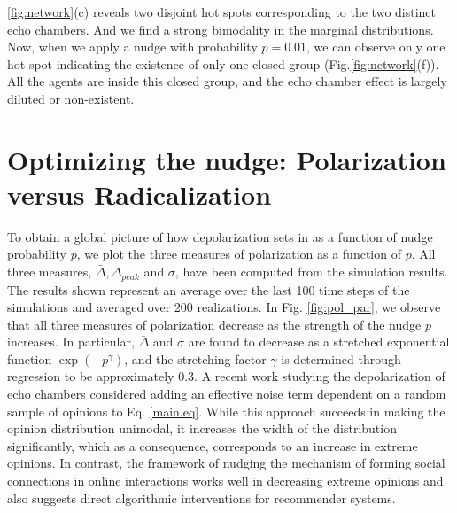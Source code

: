 \documentclass[%
 reprint,
superscriptaddress,
 amsmath,amssymb,
 aps,
 pre,
]{revtex4-1}
\begin{document}
\ref{fig:network}(c) reveals two disjoint hot spots corresponding to the two distinct echo chambers. And we find a strong bimodality in the marginal distributions.
Now, when we apply a nudge with probability $p=0.01$, we can observe only one hot spot indicating the existence of only one closed group (Fig.\ref{fig:network}(f)). All the agents are inside this closed group, and the echo chamber effect is largely diluted or non-existent. 

\section{Optimizing the nudge: Polarization versus Radicalization} 
To obtain a global picture of how depolarization sets in as a function of nudge probability $p$, we plot the three measures of polarization as a function of $p$. All three measures, $\bar\Delta, \Delta_{peak}$ and $\sigma$, have been computed from the simulation results. The results shown represent an average over the last 100 time steps of the simulations and averaged over 200 realizations. In Fig. \ref{fig:pol_par}, we observe that all three measures of polarization decrease as the strength of the nudge $p$ increases. In particular, $\bar \Delta$ and $\sigma$ are found to decrease as a stretched exponential function $\exp(-p^\gamma)$, and the stretching factor $\gamma$ is determined through regression to be approximately $0.3$. A recent work studying the depolarization of echo chambers \cite{depolarization-of-echo-chambers-by-random-dynamical-nudge} considered adding an effective noise term dependent on a random sample of opinions to Eq. \ref{main.eq}. While this approach succeeds in making the opinion distribution unimodal, it increases the width of the distribution significantly, which as a consequence, corresponds to an increase in extreme opinions. In contrast, the framework of nudging the mechanism of forming social connections in online interactions works well in decreasing  extreme opinions  and also suggests direct algorithmic interventions for recommender systems.
\end{document}
